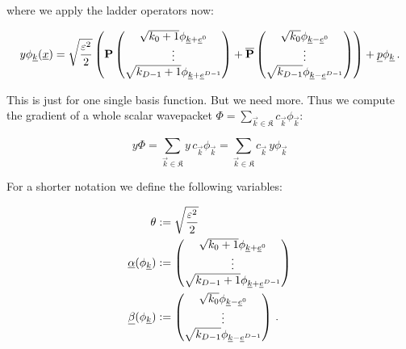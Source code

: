 where we apply the ladder operators now:

\begin{equation} \label{eq:grad_basis_function_DD}
  y \phi_{\underline{k}}(\underline{x})
  =
  \sqrt{\frac{\varepsilon^2}{2}}
  \left(
    \mathbf{P}
    \begin{pmatrix}
      \sqrt{k_0 + 1} \phi_{\underline{k}+\underline{e}^0} \\
      \vdots \\
      \sqrt{k_{D-1} + 1} \phi_{\underline{k}+\underline{e}^{D-1}}
    \end{pmatrix}
    +
    \overline{\mathbf{P}}
    \begin{pmatrix}
      \sqrt{k_0} \phi_{\underline{k}-\underline{e}^0} \\
      \vdots \\
      \sqrt{k_{D-1}} \phi_{\underline{k}-\underline{e}^{D-1}}
    \end{pmatrix}
  \right)
  + \underline{p} \phi_{\underline{k}} \,.
\end{equation}

This is just for one single basis function. But we need more.
Thus we compute the gradient of a whole scalar wavepacket
$\Phi = \sum_{\vec{k}\in\mathfrak{K}} c_{\vec{k}}\phi_{\vec{k}}$:

\begin{equation*}
  y \Phi
  = \sum_{\vec{k}\in\mathfrak{K}} y \, c_{\vec{k}}\phi_{\vec{k}}
  = \sum_{\vec{k}\in\mathfrak{K}} c_{\vec{k}} \, y \phi_{\vec{k}}
\end{equation*}

For a shorter notation we define the following variables:

\begin{align*}
  \theta & := \sqrt{\frac{\varepsilon^2}{2}} \\
  \underline{\alpha}(\phi_{\underline{k}}) & :=
     \begin{pmatrix}
      \sqrt{k_0 + 1} \phi_{\underline{k}+\underline{e}^0} \\
      \vdots \\
      \sqrt{k_{D-1} + 1} \phi_{\underline{k}+\underline{e}^{D-1}}
    \end{pmatrix} \\
  \underline{\beta}(\phi_{\underline{k}}) & :=
    \begin{pmatrix}
      \sqrt{k_0} \phi_{\underline{k}-\underline{e}^0} \\
      \vdots \\
      \sqrt{k_{D-1}} \phi_{\underline{k}-\underline{e}^{D-1}}
    \end{pmatrix} \,.
\end{align*}

